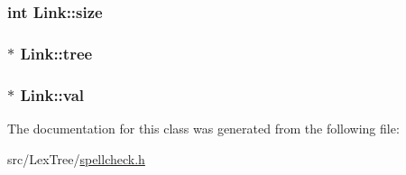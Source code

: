 \hypertarget{class_link_ac4e1488f09bc02716021b295decc8877}{
\subsubsection[{size}]{\setlength{\rightskip}{0pt plus 5cm}int Link\+::size\hspace{0.3cm}{\ttfamily [private]}}}\label{class_link_ac4e1488f09bc02716021b295decc8877}
\hypertarget{class_link_a0a5262c88eff81b5ee6889690e895593}{
\subsubsection[{tree}]{$\ast$ Link\+::tree\hspace{0.3cm}{\ttfamily [private]}}}\label{class_link_a0a5262c88eff81b5ee6889690e895593}
\hypertarget{class_link_a8095c65844d9ca0199898b7bf9df4d6c}{
\subsubsection[{val}]{$\ast$ Link\+::val\hspace{0.3cm}{\ttfamily [private]}}}\label{class_link_a8095c65844d9ca0199898b7bf9df4d6c}


The documentation for this class was generated from the following file\+:\begin{DoxyCompactItemize}
\item 
src/\+Lex\+Tree/\hyperlink{spellcheck_8h}{spellcheck.\+h}\end{DoxyCompactItemize}
